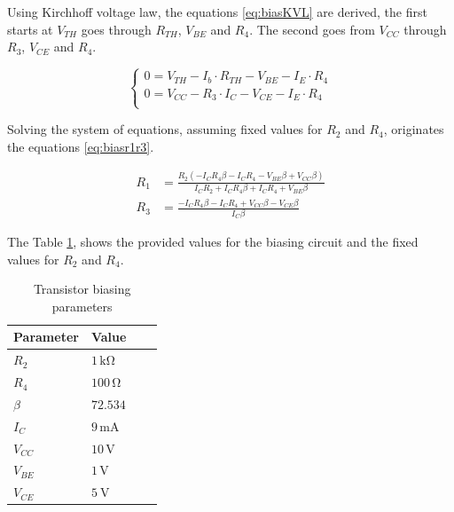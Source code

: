 Using Kirchhoff voltage law, the equations \ref{eq:biasKVL} are derived, the first starts at $V_{TH}$ goes through $R_{TH}$, $V_{BE}$ and $R_4$. The second goes from $V_{CC}$ through $R_3$, $V_{CE}$ and $R_4$. 

\begin{equation}
    \begin{cases}        
        0 = V_{TH} -I_b\cdot R_{TH} - V_{BE}-I_E\cdot R_4  \\
        0 = V_{CC} - R_3\cdot I_C - V_{CE} - I_E \cdot R_4\\
    \end{cases}
    \label{eq:biasKVL}
\end{equation}

Solving the system of equations, assuming fixed values for $R_2$ and $R_4$, originates the equations \ref{eq:biasr1r3}.

\begin{equation}
    \begin{split}
        R_1 &= \frac{R_{2} \left(- I_{C} R_{4} \beta - I_{C} R_{4} - V_{BE} \beta + V_ {CC} \beta\right)}{I_{C} R_{2} + I_{C} R_{4} \beta + I_{C} R_{4} + V_{BE} \beta}\\
        R_3 &= \frac{- I_{C} R_{4} \beta - I_{C} R_{4} + V_{CC} \beta - V_{CE} \beta}{I_{C} \beta}
    \end{split}
    \label{eq:biasr1r3}
\end{equation}

The Table \ref{tab:BiasParam}, shows the provided values for the biasing circuit and the fixed values for $R_2$ and $R_4$.

\begin{table}[h]
    \centering
    \caption{Transistor biasing parameters}
    \begin{tabularx}{\textwidth}{>{\centering\arraybackslash}X >{\centering\arraybackslash}X >{\centering\arraybackslash}X >{\centering\arraybackslash}X}
        \toprule
        \textbf{Parameter} & \textbf{Value} \\
        \midrule
        $R_2$     & $1\,\si{\kilo\ohm}$ \\
        \midrule
        $R_4$     & $100\,\si{\ohm}$\\
        \midrule
        $\beta$   & $72.534$ \\
        \midrule
        $I_C$     & $9\,\si{\milli\ampere}$ \\
        \midrule
        $V_{CC}$  & $10\,\si{\volt}$ \\
        \midrule
        $V_{BE}$  & $1\,\si{\volt}$ \\
        \midrule
        $V_{CE}$  & $\SI{5}{\volt}$\\
        \bottomrule
    \end{tabularx}
    \label{tab:BiasParam}
\end{table}

